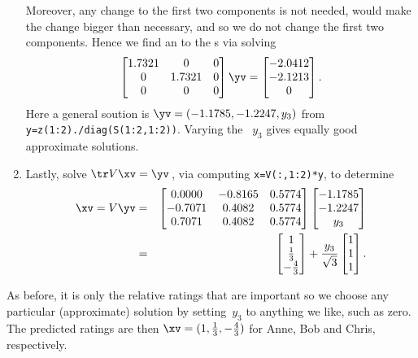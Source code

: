 \begin{example}
\begin{enumerate}
Moreover, any change to the first two components is not needed, would make the change bigger than necessary, and so we do not change the first two components.
Hence we find an  to the s via solving
\begin{equation*}
\begin{bmatrix} 1.7321&0&0
\\0&1.7321&0
\\0&0&0 \end{bmatrix}\yv=\begin{bmatrix} 
   -2.0412\\-2.1213\\0
\end{bmatrix}.
\end{equation*}
Here a general soution is \(\yv=(-1.1785,-1.2247,y_3)\) from \verb|y=z(1:2)./diag(S(1:2,1:2))|.
Varying the ~\(y_3\) gives equally good approximate solutions.

\item Lastly, solve \(\tr V\xv=\yv\)\,, via computing \verb|x=V(:,1:2)*y|, to determine
\begin{eqnarray*}
\xv=V\yv&=&
\begin{bmatrix} 0.0000 & -0.8165 & 0.5774
\\ -0.7071 & 0.4082 & 0.5774
\\  0.7071 & 0.4082 & 0.5774
 \end{bmatrix}\begin{bmatrix} -1.1785\\-1.2247\\y_3 \end{bmatrix}
\\&=&\begin{bmatrix} 1\\\frac13\\-\frac43 \end{bmatrix}
+\frac{y_3}{\sqrt3}\begin{bmatrix} 1\\1\\1 \end{bmatrix}.
\end{eqnarray*}
\end{enumerate}
As before, it is only the relative ratings that are important so we  choose any particular (approximate) solution by setting~\(y_3\) to anything we like, such as zero.
The predicted ratings are then \(\xv=(1,\frac13,-\frac43)\) for Anne, Bob and Chris, respectively.
\end{example}

